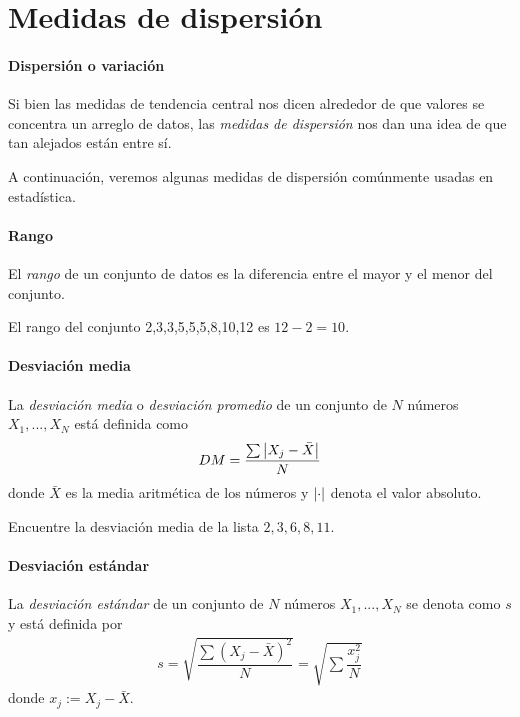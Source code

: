 \section{Medidas de dispersión}

\paragraph{Dispersión o variación}
Si bien las medidas de tendencia central nos dicen alrededor de que valores se concentra un arreglo de datos, las \emph{medidas de dispersión} nos dan una idea de que tan alejados están entre sí.





A continuación, veremos algunas medidas de dispersión comúnmente usadas en estadística.

\paragraph{Rango}
El \emph{rango}
de un conjunto de datos es la diferencia entre el mayor y el menor del conjunto.



\begin{ejemplo}
	El rango del conjunto 2,3,3,5,5,5,8,10,12 es $12-2=10.$
\end{ejemplo}


\paragraph{Desviación media}
La \emph{desviación media} o \emph{desviación promedio} de un conjunto de $N$ números $X_{1},...,X_{N}$ está definida como
\begin{align}
	DM=\dfrac{\sum \left|X_{j}-\bar{X}\right|}{N}
\end{align}
donde $\bar{X}$ es la media aritmética de los números y $\left|\cdot\right|$ denota el valor absoluto.


\begin{ejemplo}
	Encuentre la desviación media de la lista $2,3,6,8,11.$
\end{ejemplo}


\paragraph{Desviación estándar}
La \emph{desviación estándar} de un conjunto de $N$ números $X_{1},...,X_{N}$ se denota como $s$ y está definida por
\begin{align}
	s=\sqrt{\dfrac{\sum\left( X_{j}-\bar{X} \right)^{2}}{N}}=\sqrt{\sum\dfrac{x_{j}^{2}}{N}}
\end{align} donde $x_{j}:=X_{j}-\bar{X}.$


